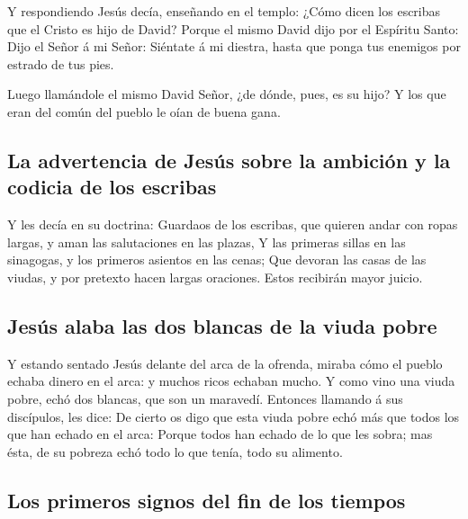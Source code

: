  Y respondiendo Jesús decía, enseñando en el templo:
¿Cómo dicen los escribas que el Cristo es hijo de David? 
Porque el mismo David dijo por el Espíritu Santo: Dijo el Señor á mi
Señor: Siéntate á mi diestra, hasta que ponga tus enemigos por estrado
de tus pies.

 Luego llamándole el mismo David Señor, ¿de dónde, pues,
es su hijo? Y los que eran del común del pueblo le oían de buena gana.

\hypertarget{la-advertencia-de-jesuxfas-sobre-la-ambiciuxf3n-y-la-codicia-de-los-escribas}{%
\subsection{La advertencia de Jesús sobre la ambición y la codicia de
los
escribas}\label{la-advertencia-de-jesuxfas-sobre-la-ambiciuxf3n-y-la-codicia-de-los-escribas}}

 Y les decía en su doctrina: Guardaos de los escribas,
que quieren andar con ropas largas, y aman las salutaciones en las
plazas,  Y las primeras sillas en las sinagogas, y los
primeros asientos en las cenas;  Que devoran las casas de
las viudas, y por pretexto hacen largas oraciones. Estos recibirán mayor
juicio.

\hypertarget{jesuxfas-alaba-las-dos-blancas-de-la-viuda-pobre}{%
\subsection{Jesús alaba las dos blancas de la viuda
pobre}\label{jesuxfas-alaba-las-dos-blancas-de-la-viuda-pobre}}

 Y estando sentado Jesús delante del arca de la ofrenda,
miraba cómo el pueblo echaba dinero en el arca: y muchos ricos echaban
mucho.  Y como vino una viuda pobre, echó dos blancas,
que son un maravedí.  Entonces llamando á sus discípulos,
les dice: De cierto os digo que esta viuda pobre echó más que todos los
que han echado en el arca:  Porque todos han echado de lo
que les sobra; mas ésta, de su pobreza echó todo lo que tenía, todo su
alimento.

\hypertarget{los-primeros-signos-del-fin-de-los-tiempos}{%
\subsection{Los primeros signos del fin de los
tiempos}\label{los-primeros-signos-del-fin-de-los-tiempos}}

